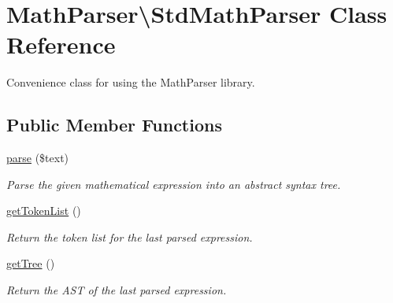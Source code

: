 \hypertarget{classMathParser_1_1StdMathParser}{\section{Math\-Parser\textbackslash{}Std\-Math\-Parser Class Reference}
\label{classMathParser_1_1StdMathParser}
}


Convenience class for using the Math\-Parser library.  


\subsection*{Public Member Functions}
\begin{DoxyCompactItemize}
\item 
\hyperlink{classMathParser_1_1StdMathParser_a8eb08ff6c902fc7c1d01cf5ec14c67a5}{parse} (\$text)
\begin{DoxyCompactList}\small\item\em Parse the given mathematical expression into an abstract syntax tree. \end{DoxyCompactList}\item 
\hyperlink{classMathParser_1_1StdMathParser_a656006e54a870b98dfa9352e7cc02ebe}{get\-Token\-List} ()
\begin{DoxyCompactList}\small\item\em Return the token list for the last parsed expression. \end{DoxyCompactList}\item 
\hyperlink{classMathParser_1_1StdMathParser_a9c824c8b42c4ed45b4b6b212eb06b617}{get\-Tree} ()
\begin{DoxyCompactList}\small\item\em Return the A\-S\-T of the last parsed expression. \end{DoxyCompactList}\end{DoxyCompactItemize}

